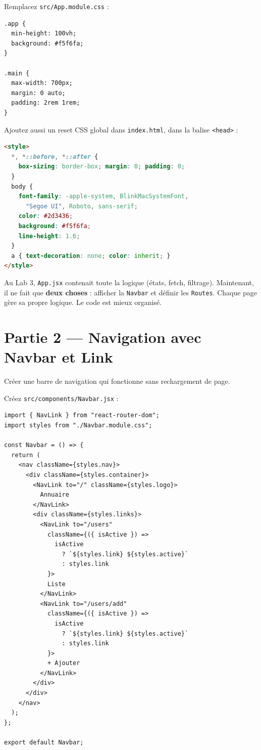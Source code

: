 \documentclass[11pt,a4paper]{article}
\begin{document}
Remplacez \texttt{src/App.module.css} :

\begin{lstlisting}[style=css]
.app {
  min-height: 100vh;
  background: #f5f6fa;
}

.main {
  max-width: 700px;
  margin: 0 auto;
  padding: 2rem 1rem;
}
\end{lstlisting}

Ajoutez aussi un reset CSS global dans \texttt{index.html}, dans la balise \texttt{<head>} :

\begin{lstlisting}[language=HTML]
<style>
  *, *::before, *::after {
    box-sizing: border-box; margin: 0; padding: 0;
  }
  body {
    font-family: -apple-system, BlinkMacSystemFont,
      "Segoe UI", Roboto, sans-serif;
    color: #2d3436;
    background: #f5f6fa;
    line-height: 1.6;
  }
  a { text-decoration: none; color: inherit; }
</style>
\end{lstlisting}

\begin{infobox}
Au Lab 3, \texttt{App.jsx} contenait toute la logique (états, fetch, filtrage). Maintenant, il ne fait que \textbf{deux choses} : afficher la \texttt{Navbar} et définir les \texttt{Routes}. Chaque page gère sa propre logique. Le code est mieux organisé.
\end{infobox}

\section{Partie 2 --- Navigation avec Navbar et Link}
\label{sec:navbar}

\begin{objectifbox}
Créer une barre de navigation qui fonctionne sans rechargement de page.
\end{objectifbox}

Créez \texttt{src/components/Navbar.jsx} :

\begin{lstlisting}
import { NavLink } from "react-router-dom";
import styles from "./Navbar.module.css";

const Navbar = () => {
  return (
    <nav className={styles.nav}>
      <div className={styles.container}>
        <NavLink to="/" className={styles.logo}>
          Annuaire
        </NavLink>
        <div className={styles.links}>
          <NavLink to="/users"
            className={({ isActive }) =>
              isActive
                ? `${styles.link} ${styles.active}`
                : styles.link
            }>
            Liste
          </NavLink>
          <NavLink to="/users/add"
            className={({ isActive }) =>
              isActive
                ? `${styles.link} ${styles.active}`
                : styles.link
            }>
            + Ajouter
          </NavLink>
        </div>
      </div>
    </nav>
  );
};

export default Navbar;
\end{lstlisting}
\end{document}
